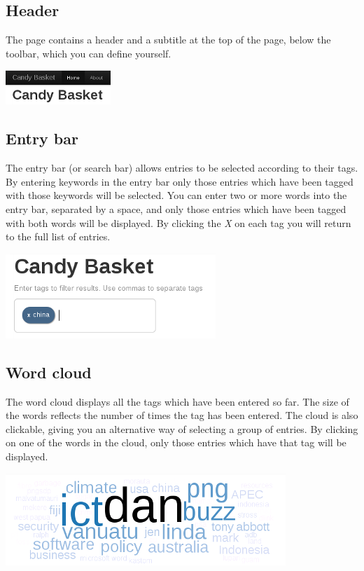 \documentclass[letterpaper,10pt,english]{sphinxmanual}
\begin{document}
\subsection{Header}
\label{user-guide:header}
The page contains a header and a subtitle at the top of the page,
below the toolbar, which you can define yourself.

{\hfill\includegraphics{candy-basket-header.png}\hfill}


\subsection{Entry bar}
\label{user-guide:entry-bar}
The entry bar (or search bar) allows entries to be selected
according to their tags. By entering keywords in the entry bar only
those entries which have been tagged with those keywords will be
selected. You can enter two or more words into the entry bar,
separated by a space, and only those entries which have been tagged with
both words will be displayed. By clicking the \emph{X} on each tag you
will return to the full list of entries.

{\hfill\includegraphics{candy-basket-search.png}\hfill}


\subsection{Word cloud}
\label{user-guide:word-cloud}
The word cloud displays all the tags which have been entered so
far. The size of the words reflects the number of times the tag has
been entered. The cloud is also clickable, giving you an
alternative way of selecting a group of entries. By clicking on one
of the words in the cloud, only those entries which have that tag will
be displayed.

{\hfill\includegraphics{candy-basket-wordcloud.png}\hfill}
\end{document}
